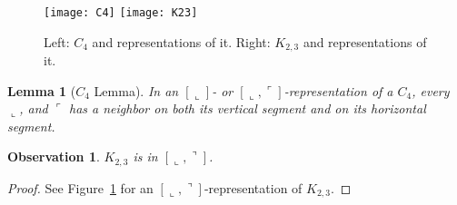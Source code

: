 \documentclass[11pt,3p,times]{elsarticle}
\newenvironment{myproof}{\begin{proof}}{\end{proof}}
\newcommand{\La}{\ensuremath{\llcorner}} \newcommand{\Lb}{\ensuremath{\ulcorner}} \newcommand{\Lc}{\ensuremath{\lrcorner}} \newcommand{\Ld}{\ensuremath{\urcorner}}
\newtheorem{observation}[theorem]{Observation}
\newtheorem{lemma}[theorem]{Lemma}
\begin{document}
\begin{figure}[bth]
\hfill
\texttt{[image: C4]}
\hfill
\texttt{[image: K23]}
\hfill \ \caption{Left: $C_4$ and representations of it. Right:
$K_{2,3}$ and representations of it.}\label{fig:C4-K23}
\end{figure}
\begin{lemma}[$C_4$ Lemma]\label{lem:C4}
In an $[\La]$- or $[\La,\Lb]$-representation of a $C_4$, every $\La$,  and $\Lb$ has a neighbor on both its vertical segment and on its horizontal segment.
\end{lemma}

\begin{observation}
$K_{2,3}$ is in $[\La,\Ld]$.
\end{observation}
\begin{myproof}
See Figure~\ref{fig:C4-K23} for an $[\La,\Ld]$-representation of $K_{2,3}$.
\end{myproof}
\end{document}
